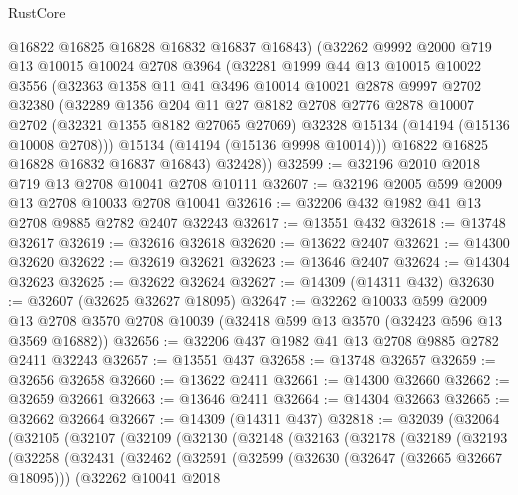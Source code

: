 \begin{lexlean}{RustCore}
\begin{coremodule}
        @16822
        @16825
        @16828
        @16832
        @16837
        @16843)
      (@32262
        @9992
        @2000
        @719
        @13
        @10015
        @10024
        @2708
        @3964
        (@32281
          @1999
          @44
          @13
          @10015
          @10022
          @3556
          (@32363
            @1358
            @11
            @41
            @3496
            @10014
            @10021
            @2878
            @9997
            @2702
            @32380
            (@32289
              @1356
              @204
              @11
              @27
              @8182
              @2708
              @2776
              @2878
              @10007
              @2702
              (@32321 @1355 @8182 @27065 @27069)
              @32328
              @15134
              (@14194 (@15136 @10008 @2708)))
            @15134
            (@14194 (@15136 @9998 @10014)))
          @16822
          @16825
          @16828
          @16832
          @16837
          @16843)
        @32428))
@32599 := @32196 @2010 @2018 @719 @13 @2708 @10041 @2708 @10111
@32607 := @32196 @2005 @599 @2009 @13 @2708 @10033 @2708 @10041
@32616 := @32206 @432 @1982 @41 @13 @2708 @9885 @2782 @2407 @32243
@32617 := @13551 @432
@32618 := @13748 @32617
@32619 := @32616 @32618
@32620 := @13622 @2407
@32621 := @14300 @32620
@32622 := @32619 @32621
@32623 := @13646 @2407
@32624 := @14304 @32623
@32625 := @32622 @32624
@32627 := @14309 (@14311 @432)
@32630 := @32607 (@32625 @32627 @18095)
@32647 := @32262
    @10033
    @599
    @2009
    @13
    @2708
    @3570
    @2708
    @10039
    (@32418 @599 @13 @3570 (@32423 @596 @13 @3569 @16882))
@32656 := @32206 @437 @1982 @41 @13 @2708 @9885 @2782 @2411 @32243
@32657 := @13551 @437
@32658 := @13748 @32657
@32659 := @32656 @32658
@32660 := @13622 @2411
@32661 := @14300 @32660
@32662 := @32659 @32661
@32663 := @13646 @2411
@32664 := @14304 @32663
@32665 := @32662 @32664
@32667 := @14309 (@14311 @437)
@32818 := @32039
    (@32064
      (@32105
        (@32107
          (@32109
            (@32130
              (@32148
                (@32163
                  (@32178
                    (@32189
                      (@32193
                        (@32258
                          (@32431
                            (@32462
                              (@32591
                                (@32599
                                  (@32630 (@32647 (@32665 @32667 @18095)))
                                  (@32262
                                    @10041
                                    @2018

\end{coremodule}
\end{lexlean}
